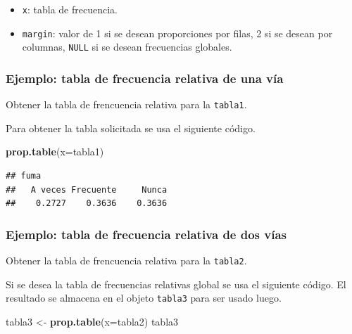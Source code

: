 \documentclass[10pt,]{krantz}
\makeatletter
\newenvironment{Shaded}{\begin{snugshade}}{\end{snugshade}}
\newcommand{\KeywordTok}[1]{\textcolor[rgb]{0.13,0.29,0.53}{\textbf{#1}}}
\newcommand{\DataTypeTok}[1]{\textcolor[rgb]{0.13,0.29,0.53}{#1}}
\newcommand{\StringTok}[1]{\textcolor[rgb]{0.31,0.60,0.02}{#1}}
\newcommand{\NormalTok}[1]{#1}
\providecommand{\tightlist}{%
  \setlength{\itemsep}{0pt}\setlength{\parskip}{0pt}}
\newenvironment{kframe}{%
\medskip{}
\setlength{\fboxsep}{.8em}
 \def\at@end@of@kframe{}%
 \ifinner\ifhmode%
  \def\at@end@of@kframe{\end{minipage}}%
  \begin{minipage}{\columnwidth}%
 \fi\fi%
 \def\FrameCommand##1{\hskip\@totalleftmargin \hskip-\fboxsep
 \colorbox{shadecolor}{##1}\hskip-\fboxsep
     \hskip-\linewidth \hskip-\@totalleftmargin \hskip\columnwidth}%
 \MakeFramed {\advance\hsize-\width
   \@totalleftmargin\z@ \linewidth\hsize
   \@setminipage}}%
 {\par\unskip\endMakeFramed%
 \at@end@of@kframe}
\renewenvironment{Shaded}{\begin{kframe}}{\end{kframe}}
\makeatother
\begin{document}
\begin{itemize}
\tightlist
\item
  \texttt{x}: tabla de frecuencia.
\item
  \texttt{margin}: valor de 1 si se desean proporciones por filas, 2 si
  se desean por columnas, \texttt{NULL} si se desean frecuencias
  globales.
\end{itemize}

\subsubsection*{Ejemplo: tabla de frecuencia relativa de una
vía}\label{ejemplo-tabla-de-frecuencia-relativa-de-una-via}

Obtener la tabla de frencuencia relativa para la \texttt{tabla1}.

Para obtener la tabla solicitada se usa el siguiente código.

\begin{Shaded}
\begin{Highlighting}[]
\KeywordTok{prop.table}\NormalTok{(}\DataTypeTok{x=}\NormalTok{tabla1)}
\end{Highlighting}
\end{Shaded}

\begin{verbatim}
## fuma
##   A veces Frecuente     Nunca 
##    0.2727    0.3636    0.3636
\end{verbatim}

\subsubsection*{Ejemplo: tabla de frecuencia relativa de dos
vías}\label{ejemplo-tabla-de-frecuencia-relativa-de-dos-vias}

Obtener la tabla de frencuencia relativa para la \texttt{tabla2}.

Si se desea la tabla de frecuencias relativas global se usa el siguiente
código. El resultado se almacena en el objeto \texttt{tabla3} para ser
usado luego.

\begin{Shaded}
\begin{Highlighting}[]
\NormalTok{tabla3 <-}\StringTok{ }\KeywordTok{prop.table}\NormalTok{(}\DataTypeTok{x=}\NormalTok{tabla2)}
\NormalTok{tabla3}
\end{Highlighting}
\end{Shaded}
\end{document}
